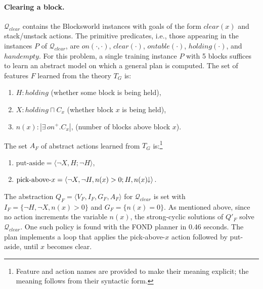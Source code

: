 \documentclass[letterpaper]{article} %
\newcommand{\tup}[1]{\langle #1 \rangle}
\newcommand{\abs}[1]{\ensuremath{\left\vert{#1}\right\vert}}
\newcommand{\Q}{\mathcal{Q}}
\newcommand{\abst}[2]{\tup{#1;#2}}
\newcommand{\mminus}{\hspace{-.05em}\raisebox{.15ex}{\footnotesize$\downarrow$}}
\begin{document}
\paragraph{Clearing a block.}
$\Q_{clear}$ contains the Blocksworld instances  with goals of the form  $clear(x)$
and stack/unstack actions. The primitive predicates, i.e., those appearing in the  instances $P$ of $\Q_{clear}$, 
are $on(\cdot,\cdot)$, $clear(\cdot)$, $ontable(\cdot)$, $holding(\cdot)$, and $handempty$. 
For this problem, a  single training instance $P$  with  5 blocks suffices to learn an abstract
model on which a general plan is computed. The  set of features $F$ learned from the theory $T_G$ is:
\begin{enumerate}[--]
  \item $H: holding$ (whether some block is being held),
  \item $X: holding \sqcap C_x$ (whether block $x$ is being held),
  \item $n(x): \abs{\exists\,on^+ . C_x}$, (number of blocks above block $x$).
\end{enumerate}

\noindent The set $A_F$  of abstract actions learned  from $T_G$ is:\footnote{Feature and action
  names are provided to make their meaning explicit; the meaning follows from their syntactic form.}

\begin{enumerate}[--]
  \item $\text{put-aside} = \abst{\neg X, H}{\neg H}$,
  \item $\text{pick-above-$x$} = \abst{\neg X, \neg H, n(x) > 0}{H, n(x)\mminus}$.
\end{enumerate}

The  abstraction $Q_F=\tup{V_F,I_F,G_F,A_F}$ for $\Q_{clear}$ is set with 
$I_F = \{\neg H, \neg X, n(x) > 0\}$ and $G_F=\{n(x)=0\}$.
As mentioned above, since no action increments the variable $n(x)$,
the strong-cyclic solutions of $Q'_F$ solve $\Q_{clear}$.
One such policy is found with the FOND planner in 0.46 seconds.
The plan implements a loop that applies the pick-above-$x$
action followed by put-aside, until $x$ becomes clear. 


% 

%
\end{document}
